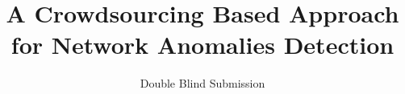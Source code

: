 \documentclass{sig-alternate}
\begin{document}
%

\title{A Crowdsourcing Based Approach for Network Anomalies Detection}


\author{
       \alignauthor
       Double Blind Submission
%
%
}
\end{document}
